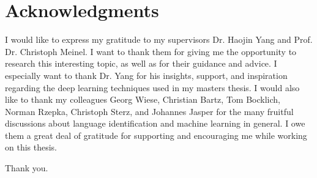 \section*{\LARGE Acknowledgments}
I would like to express my gratitude to my supervisors Dr. Haojin Yang and Prof. Dr. Christoph Meinel. I want to thank them for giving me the opportunity to research this interesting topic, as well as for their guidance and advice. I especially want to thank Dr. Yang for his insights, support, and inspiration regarding the deep learning techniques used in my masters thesis.
I would also like to thank my colleagues Georg Wiese, Christian Bartz, Tom Bocklich, Norman Rzepka, Christoph Sterz, and Johannes Jasper for the many fruitful discussions about language identification and machine learning in general. I owe them a great deal of gratitude for supporting and encouraging me while working on this thesis.

Thank you.


